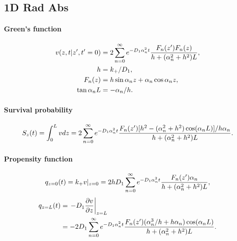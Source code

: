 
\subsection{1D Rad Abs}

\paragraph{Green's function}
\begin{align}
  v(z,t|z',t'=0) &= 2\sum_{n=0}^{\infty}
  e^{-D_1\alpha_n^2t} \frac
  { F_n(z')F_n(z) }
  {h + (\alpha_n^2 + h^2)L}, \\
  h &= k_+ / D_1, \\
  F_n(z) &= h\sin\alpha_n z +  \alpha_n\cos\alpha_n z  , \\
  \tan\alpha_n L &= -\alpha_n/h.
\end{align}

\paragraph{Survival probability}
\begin{align}
  S_z(t) = \int_0^Lvdz
  = 2\sum_{n=0}^{\infty} e^{-D_1\alpha_n^2t}
    \frac{F_n(z')
[h^2 - (\alpha_n^2 + h^2) \cos(\alpha_n L)] /h\alpha_n }
  {h + (\alpha_n^2 + h^2)L}.
\end{align}

\paragraph{Propensity function}
\begin{align}
  q_{z=0}(t) = k_+ v|_{z=0} = 2hD_1 \sum_{n=0}^{\infty} e^{-D_1\alpha_n^2t}
  \frac{ F_n(z') \alpha_n} {h + (\alpha_n^2 + h^2)L},
\end{align}
\begin{align}
  q_{z=L}(t) &= \left.- D_1 \frac{\partial v}{\partial z}\right|_{z=L} \\
  &=  -2D_1 \sum_{n=0}^{\infty} e^{-D_1\alpha_n^2t}
    \frac{F_n(z') (\alpha_n^3/h + h\alpha_n)\cos(\alpha_n L)
 }
  {h + (\alpha_n^2 + h^2)L}.
\end{align}

